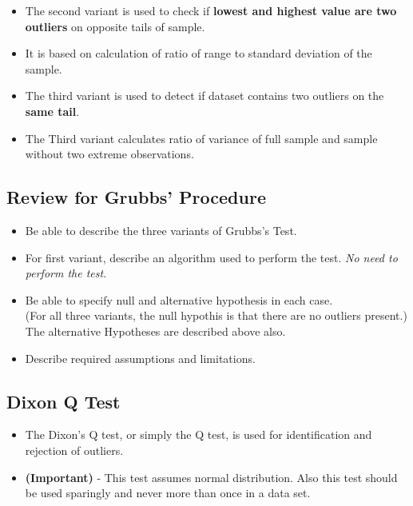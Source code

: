 \documentclass[a4paper,12pt]{article}
\begin{document}
\begin{itemize}
	\item The second variant is used to check if \textbf{lowest and highest value are two outliers} on opposite tails of
	sample. 
	\item It is based on calculation of ratio of range to standard deviation of the sample.
	\bigskip
	\item The third variant is used to detect if dataset contains two outliers on the \textbf{same tail}.
	\item The Third variant calculates ratio of variance of full sample and sample without two extreme observations.
	
\end{itemize}

\subsection{Review for Grubbs' Procedure}
\begin{itemize}
	\item Be able to describe the three variants of Grubbs's Test.
	\item For first variant, describe an algorithm used to perform the test. \textit{No need to perform the test}.
	\item Be able to specify null and alternative hypothesis in each case.\\ (For all three variants, the null hypothis is that there are no outliers present.) \\ The alternative Hypotheses are described above also.
	\item Describe required assumptions and limitations.
\end{itemize}
\subsection{Dixon Q Test}
\begin{itemize}
	\item The Dixon's Q test, or simply the Q test, is used for identification and rejection of outliers. 
	\item \textbf{(Important)} - This test assumes normal distribution. Also this test should be used sparingly and never more than once in a data set. 
\end{itemize}
\end{document}
